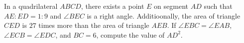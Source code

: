 In a quadrilateral $ABCD$, there exists a point $E$ on segment $AD$ such that $AE : ED = 1 : 9$ and $\angle BEC$ is a right angle. Additioonally, the area of triangle $CED$ is $27$ times more than the area of triangle $AEB$. If $\angle EBC = \angle EAB$, $\angle ECB = \angle EDC$, and $BC = 6$, compute the value of $AD^2$.
